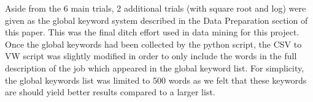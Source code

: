 Aside from the 6 main trials, 2 additional trials (with square root and log) were given as the global keyword system described in the Data Preparation
section of this paper. This was the final ditch effort used in data mining for this project. Once the global keywords had
been collected by the python script, the CSV to VW script was slightly modified in order to only include the words in the full
description of the job which appeared in the global keyword list. For simplicity, the global keywords list was limited to
500 words as we felt that these keywords are should yield better results compared to a larger list.
